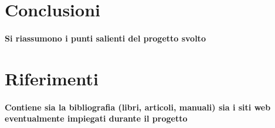 \documentclass{article}
\begin{document}
\newpage
\section{Conclusioni}
\paragraph{Si riassumono i punti salienti del progetto svolto}

\newpage
\section{Riferimenti}
\paragraph{Contiene  sia  la  bibliografia  (libri,  articoli,  manuali)  sia  i  siti  web  eventualmente  impiegati  durante il progetto}
\end{document}
